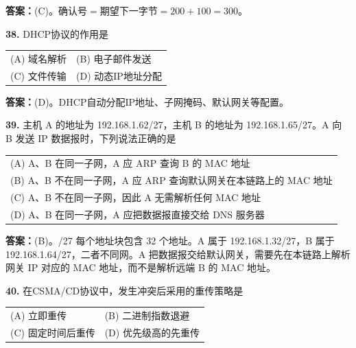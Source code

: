 \ifshowsolutions\par\noindent\textbf{答案：}(C)。确认号$=$期望下一字节$=200+100=300$。\else \answerarea \fi

\vspace{6pt}

\noindent\textbf{38.} DHCP协议的作用是
\begin{center}
\begin{tabular}{ll}
(A) 域名解析 & (B) 电子邮件发送 \\[6pt]
(C) 文件传输 & (D) 动态IP地址分配
\end{tabular}
\end{center}

\ifshowsolutions\par\noindent\textbf{答案：}(D)。DHCP自动分配IP地址、子网掩码、默认网关等配置。\else \answerarea \fi

\vspace{6pt}

\noindent\textbf{39.} 主机 A 的地址为 192.168.1.62/27，主机 B 的地址为 192.168.1.65/27。A 向 B 发送 IP 数据报时，下列说法正确的是
\begin{center}
\begin{tabularx}{0.96\linewidth}{@{}X@{}}
(A) A、B 在同一子网，A 应 ARP 查询 B 的 MAC 地址 \\[4pt]
(B) A、B 不在同一子网，A 应 ARP 查询默认网关在本链路上的 MAC 地址 \\[4pt]
(C) A、B 不在同一子网，因此 A 无需解析任何 MAC 地址 \\[4pt]
(D) A、B 在同一子网，A 应把数据报直接交给 DNS 服务器
\end{tabularx}
\end{center}

\ifshowsolutions\par\noindent\textbf{答案：}(B)。/27 每个地址块包含 32 个地址。A 属于 192.168.1.32/27，B 属于 192.168.1.64/27，二者不同网。A 把数据报交给默认网关，需要先在本链路上解析网关 IP 对应的 MAC 地址，而不是解析远端 B 的 MAC 地址。\else \answerarea \fi

\vspace{6pt}

\noindent\textbf{40.} 在CSMA/CD协议中，发生冲突后采用的重传策略是
\begin{center}
\begin{tabular}{ll}
(A) 立即重传 & (B) 二进制指数退避 \\[6pt]
(C) 固定时间后重传 & (D) 优先级高的先重传
\end{tabular}
\end{center}

